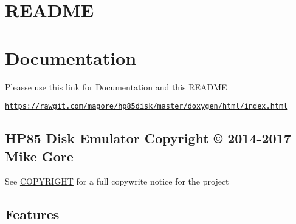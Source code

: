 \hypertarget{md_README_README}{}\section{R\+E\+A\+D\+ME}\label{md_README_README}
\section*{Documentation}


\begin{DoxyItemize}
\item Pleasse use this link for Documentation and this R\+E\+A\+D\+ME
\begin{DoxyItemize}
\item \href{https://rawgit.com/magore/hp85disk/master/doxygen/html/index.html}{\tt https\+://rawgit.\+com/magore/hp85disk/master/doxygen/html/index.\+html}
\end{DoxyItemize}
\end{DoxyItemize}

\subsection*{H\+P85 Disk Emulator Copyright \copyright{} 2014-\/2017 Mike Gore}


\begin{DoxyItemize}
\item See \hyperlink{md_COPYRIGHT}{C\+O\+P\+Y\+R\+I\+G\+HT} for a full copywrite notice for the project
\end{DoxyItemize}

\subsection*{Features}


